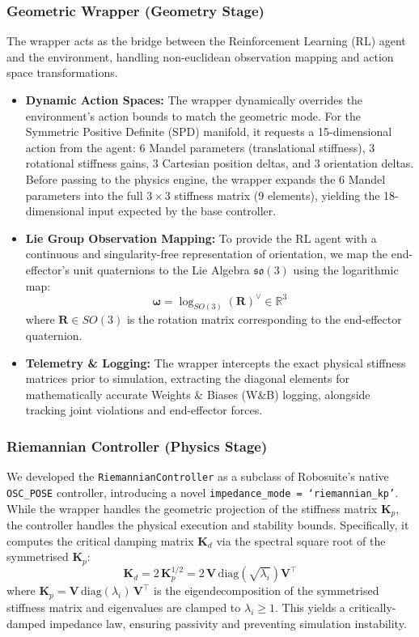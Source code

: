 \documentclass[letterpaper, 10 pt, conference]{IEEEtran}
\begin{document}
\subsubsection{Geometric Wrapper (Geometry Stage)}
The wrapper acts as the bridge between the Reinforcement Learning (RL) agent and the environment, handling non-euclidean observation mapping and action space transformations. 
\begin{itemize}
    \item \textbf{Dynamic Action Spaces:} The wrapper dynamically overrides the environment's action bounds to match the geometric mode. For the Symmetric Positive Definite (SPD) manifold, it requests a 15-dimensional action from the agent: 6 Mandel parameters (translational stiffness), 3 rotational stiffness gains, 3 Cartesian position deltas, and 3 orientation deltas. Before passing to the physics engine, the wrapper expands the 6 Mandel parameters into the full $3 \times 3$ stiffness matrix (9 elements), yielding the 18-dimensional input expected by the base controller.
    \item \textbf{Lie Group Observation Mapping:} To provide the RL agent with a continuous and singularity-free representation of orientation, we map the end-effector's unit quaternions to the Lie Algebra $\mathfrak{so}(3)$ using the logarithmic map:
    \begin{equation}
        \bm{\omega} = \log_{SO(3)}(\mathbf{R})^{\vee} \in \mathbb{R}^3
    \end{equation}
    where $\mathbf{R} \in SO(3)$ is the rotation matrix corresponding to the end-effector quaternion.
    \item \textbf{Telemetry \& Logging:} The wrapper intercepts the exact physical stiffness matrices prior to simulation, extracting the diagonal elements for mathematically accurate Weights \& Biases (W\&B) logging, alongside tracking joint violations and end-effector forces.
\end{itemize}

\subsubsection{Riemannian Controller (Physics Stage)}
We developed the \texttt{RiemannianController} as a subclass of Robosuite's native \texttt{OSC\_POSE} controller, introducing a novel \texttt{impedance\_mode = `riemannian\_kp'}. 
While the wrapper handles the geometric projection of the stiffness matrix $\mathbf{K}_p$, the controller handles the physical execution and stability bounds. Specifically, it computes the critical damping matrix $\mathbf{K}_d$ via the spectral square root of the symmetrised $\mathbf{K}_p$:
\begin{equation}
    \mathbf{K}_d = 2\,\mathbf{K}_p^{1/2} = 2\,\mathbf{V}\,\mathrm{diag}\!\left(\sqrt{\lambda_i}\right)\mathbf{V}^\top
\end{equation}
where $\mathbf{K}_p = \mathbf{V}\,\mathrm{diag}(\lambda_i)\,\mathbf{V}^\top$ is the eigendecomposition of the symmetrised stiffness matrix and eigenvalues are clamped to $\lambda_i \geq 1$. This yields a critically-damped impedance law, ensuring passivity and preventing simulation instability.
\end{document}
